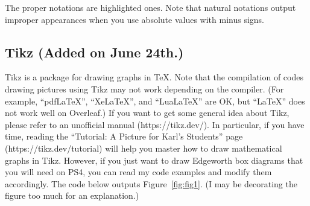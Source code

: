 \documentclass[a4paper]{article}
\begin{document}
\vspace{0.5\baselineskip}

The proper notations are highlighted ones. Note that natural notations output improper appearances when you use absolute values with minus signs.\\

\subsection*{\scsnowman[hat=true,muffler=red] Tikz (Added on June 24th.)}
Tikz is a package for drawing graphs in TeX. Note that the compilation of codes drawing pictures using Tikz may not work depending on the compiler. (For example, ``pdfLaTeX'', ``XeLaTeX'', and ``LuaLaTeX'' are OK, but ``LaTeX'' does not work well on Overleaf.) If you want to get some general idea about Tikz, please refer to an unofficial manual (https://tikz.dev/). In particular, if you have time, reading the ``Tutorial: A Picture for Karl’s Students'' page (https://tikz.dev/tutorial) will help you master how to draw mathematical graphs in Tikz. However, if you just want to draw Edgeworth box diagrams that you will need on PS4, you can read my code examples and modify them accordingly. The code below outputs Figure~\ref{fig:fig1}. (I may be decorating the figure too much for an explanation.)

\newpage
\end{document}
